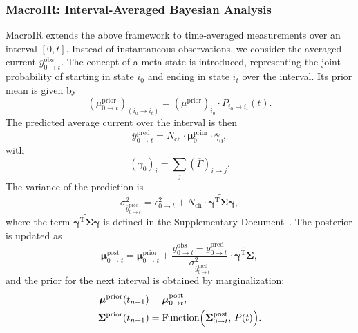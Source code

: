 \documentclass[pdflatex,sn-mathphys-num]{sn-jnl}%
\theoremstyle{thmstyleone}%
\theoremstyle{thmstyletwo}%
\theoremstyle{thmstylethree}%
\begin{document}
\subsubsection{MacroIR: Interval-Averaged Bayesian Analysis}
MacroIR extends the above framework to time-averaged measurements over an interval \([0,t]\). Instead of instantaneous observations, we consider the averaged current \(\overline{y}^{\text{obs}}_{0\rightarrow t}\). The concept of a meta-state is introduced, representing the joint probability of starting in state \(i_0\) and ending in state \(i_t\) over the interval. Its prior mean is given by
\begin{equation}
	(\mu^{\text{prior}}_{0\rightarrow t})_{(i_0\rightarrow i_t)} = (\mu^{\text{prior}})_{i_0} \cdot P_{i_0 \rightarrow i_t}(t).
	\label{eq:meta_mean_prior_short}
\end{equation}
The predicted average current over the interval is then
\begin{equation}
	\overline{y}^{\text{pred}}_{0\rightarrow t} = N_{\text{ch}} \cdot \boldsymbol{\mu}^{\text{prior}}_{0} \cdot \overline{\gamma}_{0},
	\label{eq:interval_predicted_y_short}
\end{equation}
with
\begin{equation}
	(\overline{\gamma}_{0})_i = \sum_j (\overline{\Gamma})_{i \rightarrow j}.
	\label{eq:gamma0_short}
\end{equation}
The variance of the prediction is
\begin{equation}
	\sigma^2_{\overline{y}^{\text{pred}}_{0\rightarrow t}} = \epsilon^2_{0\rightarrow t} + N_{\text{ch}} \cdot \widetilde{\boldsymbol{\gamma}^{\mathrm{T}}\boldsymbol{\Sigma}\boldsymbol{\gamma}},
	\label{eq:interval_sigma_pred_short}
\end{equation}
where the term \(\widetilde{\boldsymbol{\gamma}^{\mathrm{T}}\boldsymbol{\Sigma}\boldsymbol{\gamma}}\) is defined in the Supplementary Document~\cite{supplementary}. The posterior is updated as
\begin{equation}
	\boldsymbol{\mu}^{\text{post}}_{0\rightarrow t} = \boldsymbol{\mu}^{\text{prior}}_{0\rightarrow t} + \frac{y^{\text{obs}}_{0\rightarrow t} - \overline{y}^{\text{pred}}_{0\rightarrow t}}{\sigma^2_{\overline{y}^{\text{pred}}_{0\rightarrow t}}} \cdot \widetilde{\boldsymbol{\gamma}^{\mathrm{T}}\boldsymbol{\Sigma}},
	\label{eq:interval_post_mean_short}
\end{equation}
and the prior for the next interval is obtained by marginalization:
\begin{align}
	\boldsymbol{\mu}^{\text{prior}}(t_{n+1}) &= \boldsymbol{\mu}^{\text{post}}_{0\rightarrow t}, \label{eq:interval_next_prior_mean} \\
	\boldsymbol{\Sigma}^{\text{prior}}(t_{n+1}) &= \text{Function}\Bigl(\boldsymbol{\Sigma}^{\text{post}}_{0\rightarrow t},\, P(t)\Bigr). \label{eq:interval_next_prior_cov}
\end{align}
\end{document}

